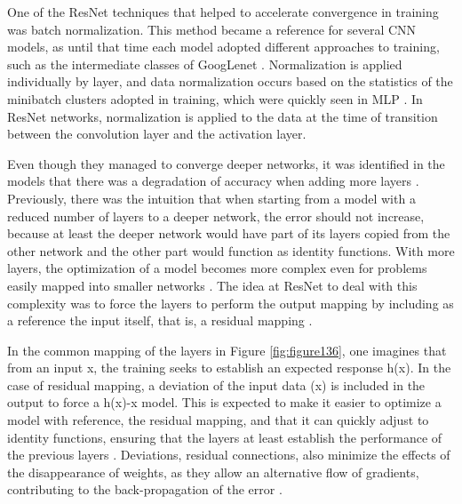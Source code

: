 One of the ResNet techniques that helped to accelerate convergence in training was batch normalization. This method became a reference for several CNN models, as until that time each model adopted different approaches to training, such as the intermediate classes of GoogLenet \cite{johnson2019}. Normalization is applied individually by layer, and data normalization occurs based on the statistics of the minibatch clusters adopted in training, which were quickly seen in MLP \cite{zhang2020dive}. In ResNet networks, normalization is applied to the data at the time of transition between the convolution layer and the activation layer.

Even though they managed to converge deeper networks, it was identified in the models that there was a degradation of accuracy when adding more layers \cite{he2016}. Previously, there was the intuition that when starting from a model with a reduced number of layers to a deeper network, the error should not increase, because at least the deeper network would have part of its layers copied from the other network and the other part would function as identity functions. With more layers, the optimization of a model becomes more complex even for problems easily mapped into smaller networks \cite{he2016}. The idea at ResNet to deal with this complexity was to force the layers to perform the output mapping by including as a reference the input itself, that is, a residual mapping \cite{geron2019}.

In the common mapping of the layers in Figure \ref{fig:figure136}, one imagines that from an input x, the training seeks to establish an expected response h(x). In the case of residual mapping, a deviation of the input data (x) is included in the output to force a h(x)-x model. This is expected to make it easier to optimize a model with reference, the residual mapping, and that it can quickly adjust to identity functions, ensuring that the layers at least establish the performance of the previous layers \cite{zhang2020dive}. Deviations, residual connections, also minimize the effects of the disappearance of weights, as they allow an alternative flow of gradients, contributing to the back-propagation of the error \cite{elgendy2020}.

